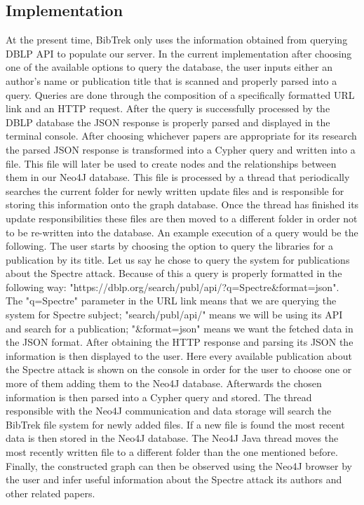 \documentclass[twocolumn]{article}
\begin{document}
\subsection{Implementation}
At the present time, BibTrek only uses the information obtained from querying DBLP API to populate our server. In the current implementation after choosing one of the available options to query the database, the user inputs either an author's name or publication title that is scanned and properly parsed into a query. Queries are done through the composition of a specifically formatted URL link and an HTTP request. After the query is successfully processed by the DBLP database the JSON response is properly parsed and displayed in the terminal console. After choosing whichever papers are appropriate for its research the parsed JSON response is transformed into a Cypher query and written into a file. This file will later be used to create nodes and the relationships between them in our Neo4J database. This file is processed by a thread that periodically searches the current folder for newly written update files and is responsible for storing this information onto the graph database. Once the thread has finished its update responsibilities these files are then moved to a different folder in order not to be re-written into the database. An example execution of a query would be the following. The user starts by choosing the option to query the libraries for a publication by its title. Let us say he chose to query the system for publications about the Spectre attack. Because of this a query is properly formatted in the following way: "https://dblp.org/search/publ/api/?q=Spectre&format=json". The "q=Spectre" parameter in the URL link means that we are querying the system for Spectre subject; "search/publ/api/" means we will be using its API and search for a publication; "&format=json" means we want the fetched data in the JSON format. After obtaining the HTTP response and parsing its JSON the information is then displayed to the user. Here every available publication about the Spectre attack is shown on the console in order for the user to choose one or more of them adding them to the Neo4J database. Afterwards the chosen information is then parsed into a Cypher query and stored. The thread responsible with the Neo4J communication and data storage will search the BibTrek file system for newly added files. If a new file is found the most recent data is then stored in the Neo4J database. The Neo4J Java thread moves the most recently written file to a different folder than the one mentioned before. Finally, the constructed graph can then be observed using the Neo4J browser by the user and infer useful information about the Spectre attack its authors and other related papers.
\end{document}
